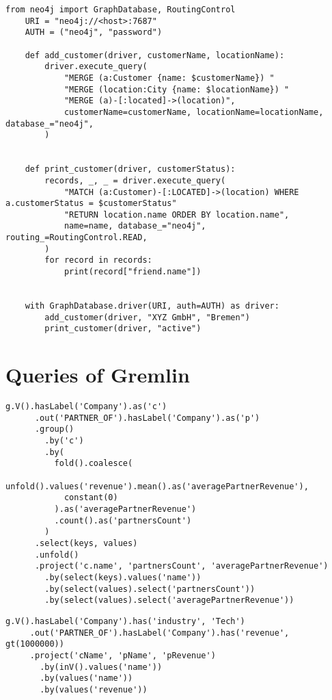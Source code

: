 \begin{lstlisting}[caption={Interact with Cypher via Python}, label={lst:pythonAndopenCypher}] 
	from neo4j import GraphDatabase, RoutingControl
	URI = "neo4j://<host>:7687"
	AUTH = ("neo4j", "password")
	
	def add_customer(driver, customerName, locationName):
		driver.execute_query(
			"MERGE (a:Customer {name: $customerName}) "
			"MERGE (location:City {name: $locationName}) "
			"MERGE (a)-[:located]->(location)",
			customerName=customerName, locationName=locationName, database_="neo4j",
		)


	def print_customer(driver, customerStatus):
		records, _, _ = driver.execute_query(
			"MATCH (a:Customer)-[:LOCATED]->(location) WHERE a.customerStatus = $customerStatus"
			"RETURN location.name ORDER BY location.name",
			name=name, database_="neo4j", routing_=RoutingControl.READ,
		)
		for record in records:
			print(record["friend.name"])


	with GraphDatabase.driver(URI, auth=AUTH) as driver:
		add_customer(driver, "XYZ GmbH", "Bremen")
		print_customer(driver, "active")
\end{lstlisting}


\section{Queries of Gremlin}

\begin{lstlisting}[caption={Aggregation and Functions in Gremlin with Company Nodes}, label={lst:companyAggregationFunctionsGremlin}]
	g.V().hasLabel('Company').as('c')
	  .out('PARTNER_OF').hasLabel('Company').as('p')
	  .group()
	    .by('c')
	    .by(
	      fold().coalesce(
	        unfold().values('revenue').mean().as('averagePartnerRevenue'),
	        constant(0)
	      ).as('averagePartnerRevenue')
	      .count().as('partnersCount')
	    )
	  .select(keys, values)
	  .unfold()
	  .project('c.name', 'partnersCount', 'averagePartnerRevenue')
	    .by(select(keys).values('name'))
	    .by(select(values).select('partnersCount'))
	    .by(select(values).select('averagePartnerRevenue'))
\end{lstlisting}

\begin{lstlisting}[caption={Expressive Filtering in Gremlin with Company Nodes}, label={lst:companyExpressiveFilteringGremlin}]
	g.V().hasLabel('Company').has('industry', 'Tech')
	 .out('PARTNER_OF').hasLabel('Company').has('revenue', gt(1000000))
	 .project('cName', 'pName', 'pRevenue')
	   .by(inV().values('name'))
	   .by(values('name'))
	   .by(values('revenue'))
\end{lstlisting}

